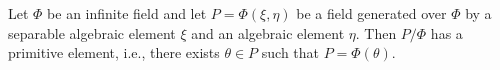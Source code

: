 Let $\Phi$ be an infinite field and let $P = \Phi(\xi, \eta)$ be a field generated over $\Phi$ by a separable algebraic element $\xi$ and an algebraic element $\eta$. Then $P/\Phi$ has a primitive element, i.e., there exists $\theta \in P$ such that $P = \Phi(\theta)$.
